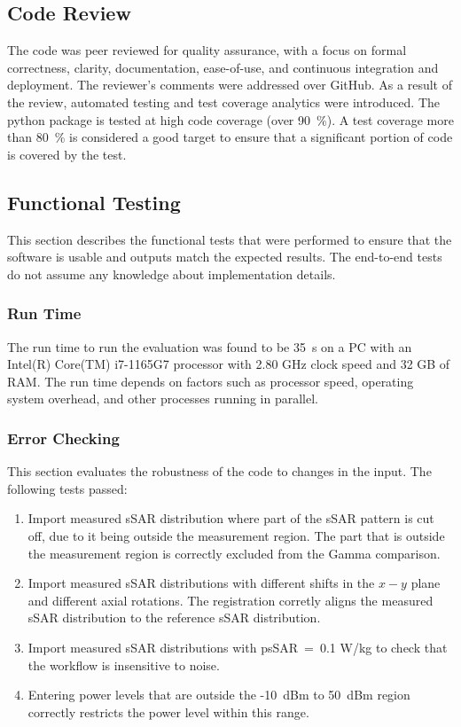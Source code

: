 \documentclass{./class/itisreport}
\begin{document}
\subsection{Code Review}\label{sec:code-review}

The code was peer reviewed for quality assurance, with a focus on formal correctness, clarity, documentation, ease-of-use, and continuous integration and deployment. The reviewer's comments were addressed over GitHub. As a result of the review, automated testing and test coverage analytics were introduced. The python package is tested at high code coverage (over 90~\%). A test coverage more than 80~\% is considered a good target to ensure that a significant portion of code is covered by the test. 

\FloatBarrier
\subsection{Functional Testing}\label{sec:func-test}

This section describes the functional tests that were performed to ensure that the software is usable and outputs match the expected results. The end-to-end tests do not assume any knowledge about implementation details.

\subsubsection{Run Time}

The run time to run the evaluation was found to be 35~s on a PC with an Intel(R) Core(TM) i7-1165G7 processor with 2.80 GHz clock speed and 32 GB of RAM. The run time depends on factors such as processor speed, operating system overhead, and other processes running in parallel.

\FloatBarrier
\subsubsection{Error Checking}

This section evaluates the robustness of the code to changes in the input. The following tests passed:

\begin{enumerate}
\item Import measured sSAR distribution where part of the sSAR pattern is cut off, due to it being outside the measurement region. The part that is outside the measurement region is correctly excluded from the Gamma comparison.
\item Import measured sSAR distributions with different shifts in the $x-y$ plane and different axial rotations. The registration corretly aligns the measured sSAR distribution to the reference sSAR distribution.
\item Import measured sSAR distributions with psSAR~=~0.1 W/kg to check that the workflow is insensitive to noise.
\item Entering power levels that are outside the -10~dBm to 50~dBm region correctly restricts the power level within this range.
\end{enumerate}
\end{document}
